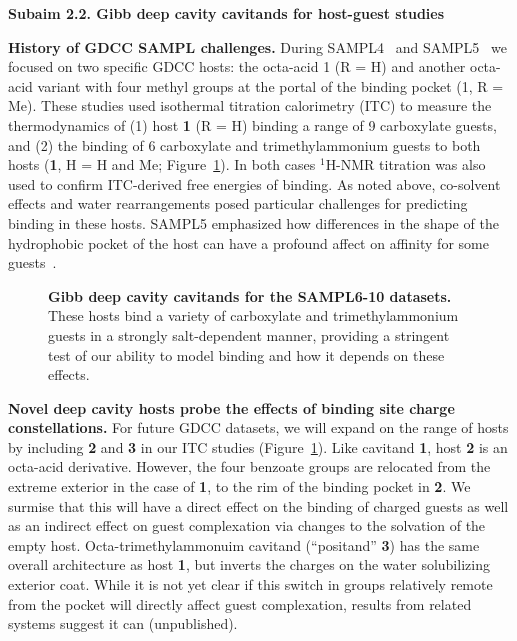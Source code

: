 \documentclass[11pt]{article}
\begin{document}
{\bf Subaim 2.2. Gibb deep cavity cavitands for host-guest studies} 


{\bf History of GDCC SAMPL challenges.} During SAMPL4~\cite{gibb_binding_2013} and SAMPL5~\cite{sullivan_binding_2016} we focused on two specific GDCC hosts: the octa-acid 1 (R = H) and another octa-acid variant with four methyl groups at the portal of the binding pocket (1, R = Me). 
These studies used isothermal titration calorimetry (ITC) to measure the thermodynamics of (1) host {\bf 1} (R = H) binding a range of 9 carboxylate guests,
and (2) the binding of 6 carboxylate and trimethylammonium guests to both hosts ({\bf 1}, H = H and Me; Figure~\ref{figure:gdccs}).  
In both cases $^1$H-NMR titration was also used to confirm ITC-derived free energies of binding.  
As noted above, co-solvent effects and water rearrangements posed particular challenges for predicting binding in these hosts. 
SAMPL5 emphasized how differences in the shape of the hydrophobic pocket of the host can have a profound affect on affinity for some guests~\cite{yin_overview_2016}.

\begin{figure}[h]
\begin{centering}

\end{centering}

\vspace{0.1in}
\caption{\footnotesize {\bf Gibb deep cavity cavitands for the SAMPL6-10 datasets.} These hosts bind a variety of carboxylate and trimethylammonium guests in a strongly salt-dependent manner, providing a stringent test of our ability to model binding and how it depends on these effects.
\label{figure:gdccs}}
\end{figure}

{\bf Novel deep cavity hosts probe the effects of binding site charge constellations.} 
For future GDCC datasets, we will expand on the range of hosts by including {\bf 2} and {\bf 3} in our ITC studies (Figure~\ref{figure:gdccs}).  
Like cavitand {\bf 1}, host {\bf 2} is an octa-acid derivative.  However, the four benzoate groups are relocated from the extreme exterior in the case of {\bf 1}, to the rim of the binding pocket in {\bf 2}.  
We surmise that this will have a direct effect on the binding of charged guests as well as an indirect effect on guest complexation via changes to the solvation of the empty host.  
Octa-trimethylammonuim cavitand (``positand'' {\bf 3}) has the same overall architecture as host {\bf 1}, but inverts the charges on the water solubilizing exterior coat.  
While it is not yet clear if this switch in groups relatively remote from the pocket will directly affect guest complexation, results from related systems suggest it can (unpublished). 
\end{document}
